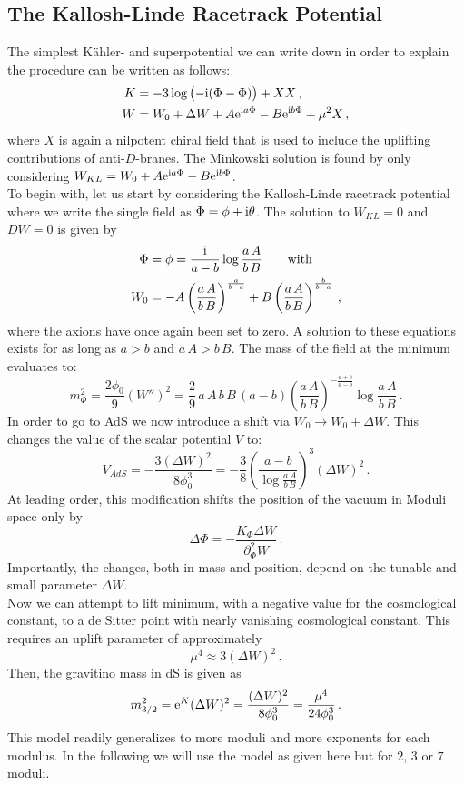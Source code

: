 \documentclass[12pt]{report}
\newcommand{\be}{\begin{equation}}
\newcommand{\ee}{\end{equation}}
\newcommand{\bea}{\begin{equation}\begin{aligned}}
\newcommand{\eea}{\end{aligned}\end{equation}}
\def\rmi{{\rm i}}
\def\rme{{\rm e}}
\begin{document}
\subsection{The Kallosh-Linde Racetrack Potential}
\label{sec:KLmodel}
The simplest Kähler- and superpotential we can write down in order to explain the procedure can be written as follows:
\bea 
K &=-3\log \left(-\rmi (\Phi - \bar{\Phi})\right) + X \bar{X}\,,\\
W &=W_0 + \Delta W +  A \rme^{\rmi a \Phi} - B \rme^{\rmi b \Phi} + \mu^2 X\,,
\label{eq:KLWandK}
\eea 
where $X$ is again a nilpotent chiral field that is used to include the uplifting contributions of anti-$D$-branes. The Minkowski solution is found by only considering $W_{KL} = W_0 +  A \rme^{\rmi a \Phi} - B \rme^{\rmi b \Phi}$.\\
To begin with, let us start by considering the Kallosh-Linde racetrack potential where we write the single field as $\Phi = \phi + \rmi \theta$. The solution to $W_{KL} = 0$ and $DW=0$ is given by
\bea
\Phi &= \phi = \frac{\rmi}{a-b} \log \frac{a\, A}{b\, B} \qquad \text{with}\\
W_0 &= -A\left(\frac{a\, A}{b\, B}\right)^{\frac{a}{b-a}} + B\left(\frac{a\, A}{b\, B}\right)^{\frac{b}{b-a}}\,,
\eea
where the axions have once again been set to zero. A solution to these equations exists for as long as $a>b$ and $a\,A > b\,B$. The mass of the field at the minimum evaluates to:
\be 
m_\Phi^2 = \frac{2\phi_0}{9} \left( W'' \right)^2 = \frac{2}{9}\, a\,A\,b\,B\,(a-b) \left( \frac{a\,A}{b\,B}\right)^{-\frac{a+b}{a-b}} \log \frac{a\, A}{b\,B}\,.
\ee
In order to go to AdS we now introduce a shift via $W_0 \to W_0 + \Delta W$. This changes the value of the scalar potential $V$ to:
\be 
V_{AdS} = - \frac{3(\Delta W)^2}{8 \phi_0^3} = -\frac{3}{8} \left(\frac{a-b}{\log \frac{a\, A}{b\,B}}\right)^3 (\Delta W)^2\,.
\ee
At leading order, this modification shifts the position of the vacuum in Moduli space only by 
\be 
\Delta \Phi = - \frac{K_\Phi \Delta W}{\partial_\Phi^2 W}\,.
\ee
Importantly, the changes, both in mass and position, depend on the tunable and small parameter $\Delta W$.\\
Now we can attempt to lift minimum, with a negative value for the cosmological constant, to a de Sitter point with nearly vanishing cosmological constant. This requires an uplift parameter of approximately
\be 
\mu^4 \approx 3 (\Delta W)^2\,.
\ee
Then, the gravitino mass in dS is given as
\be 
m_{3/2}^2 = \rme^K (\Delta W)^2 = \frac{(\Delta W)^2}{8 \phi_0^3} =  \frac{\mu^4}{24\phi_0^3}\,.
\ee
This model readily generalizes to more moduli and more exponents for each modulus. In the following we will use the model as given here but for $2$, $3$ or $7$ moduli.
\end{document}
